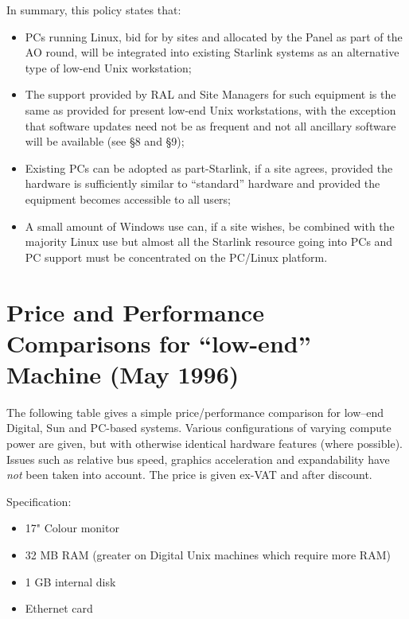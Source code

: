 \documentclass[twoside,11pt]{article}
\begin{document}
In summary, this policy states that:
\begin{itemize}
\item   PCs running Linux, bid for by sites and allocated by the Panel 
        as part of the
        AO round, will be integrated into existing Starlink systems as an
        alternative type of low-end Unix workstation;
\item   The support provided by RAL and Site Managers for such equipment
        is the same as provided for present low-end Unix workstations, with
        the exception that software updates need not be as frequent and
        not all ancillary software will be available (see \S 8 and \S 9);
\item   Existing PCs can be adopted as part-Starlink, if a site
        agrees, provided the hardware is sufficiently similar to
       ``standard'' hardware and provided the equipment becomes
        accessible to all users;
\item   A small amount of Windows use can, if a site wishes, be
        combined with the majority Linux use but almost all the Starlink 
        resource going into PCs and PC support must be concentrated on the 
        PC/Linux platform.
\end{itemize}
 
\newpage

\appendix

\section{Price and Performance Comparisons for ``low-end'' Machine (May 1996)}

The following table gives a simple price/performance comparison for
low--end Digital, Sun and PC-based systems. Various configurations of
varying compute power are given, but with otherwise identical hardware
features (where possible). Issues such as relative bus speed,
graphics acceleration and expandability have {\em not} been taken into
account. The price is given ex-VAT and after discount.

Specification:
\begin{itemize}
\item 17" Colour monitor
\item 32 MB RAM (greater on Digital Unix machines which require more RAM)
\item 1 GB internal disk
\item Ethernet card
\end{itemize}
 
\end{document}
